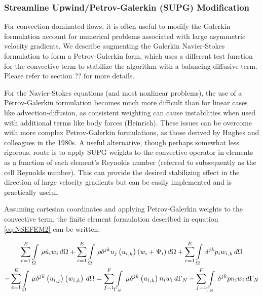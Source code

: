 \subsubsection{Streamline Upwind/Petrov-Galerkin (SUPG) Modification}

For convection dominated flows, it is often useful to modify the Galerkin formulation account for numerical problems associated with large asymmetric  velocity gradients. We describe augmenting the Galerkin Navier-Stokes formulation to form a Petrov-Galerkin form, which uses a different test function for the convective term to stabilize the algorithm with a balancing diffusive term. Please refer to section ?? for more details. 

For the Navier-Stokes equations (and most nonlinear problems), the use of a Petrov-Galerkin formulation becomes much more difficult than for linear cases like advection-diffusion, as consistent weighting can cause instabilities when used with additional terms like body forces (Heinrich). These issues can be overcome with more complex Petrov-Galerkin formulations, as those derived by Hughes and colleagues in the 1980s. A useful alternative, though perhaps somewhat less rigorous, route is to apply SUPG weights to the convective operator in elements as a function of each element's Reynolds number (referred to subsequently as the cell Reynolds number). This can provide the desired stabilizing effect in the direction of large velocity gradients but can be easily implemented and is practically useful.    

 Assuming cartesian coordinates and applying Petrov-Galerkin weights to the convective term, the finite element formulation described in equation \eqref{eq:NSEFEM2} can be written:

\begin{multline}
 \label{NSEPGFEM1}
  \displaystyle\sum_{e=1}^{E}  \displaystyle\int\limits_{\Omega}^{} \,\rho\dot{u}_{i}w_{i}\,d\Omega 
 +\displaystyle\sum_{e=1}^{E}  \displaystyle\int\limits_{\Omega}^{} \,{\rho}{\delta}^{jk}{u_j}\left(  {u_{i}}_{,k}  \right)({w_{i}+\Psi_{i}})\,d\Omega 
 +\displaystyle\sum_{e=1}^{E}  \displaystyle\int\limits_{\Omega}^{} \,{\delta}^{jk}{p_{i}}{ {w_{i}}_{,k} }\,d\Omega \\
 -\displaystyle\sum_{e=1}^{E}  \displaystyle\int\limits_{\Omega}^{} \,{\mu}{\delta}^{jk}\left(  {u_{i}}_{,j}  \right)\left(  {w_{i}}_{,k}  \right)\,d\Omega =
 \displaystyle\sum_{f=1}^{F}  \displaystyle\int\limits_{\Gamma_N}^{} \,{\mu}{\delta}^{jk}\left(  {u_{i}}_{,k}  \right){n_{i}}{w_{i}}\,d\Gamma_N 
-\displaystyle\sum_{f=1}^{F}  \displaystyle\int\limits_{\Gamma_N}^{} \,{\delta}^{jk}{p}{n_i}{w_i}\,d\Gamma_N 
\end{multline}

